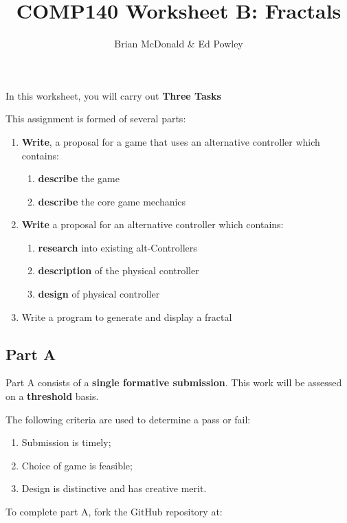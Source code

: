 \documentclass{../../../fal_assignment}
\title{COMP140 Worksheet B: Fractals}
\author{Brian McDonald \& Ed Powley}
\begin{document}
\maketitle

In this worksheet, you will carry out \textbf{Three Tasks}

This assignment is formed of several parts:

\begin{enumerate}[label=(\Alph*)]
	\item \textbf{Write}, a proposal for a game that uses an alternative controller which contains:
	\begin{enumerate}[label=\roman*.]
		\item \textbf{describe} the game
		\item \textbf{describe} the core game mechanics
	\end{enumerate}
	\item \textbf{Write} a proposal for an alternative controller which contains: 
	\begin{enumerate}[label=\roman*.]
		\item \textbf{research} into existing alt-Controllers
		\item \textbf{description} of the physical controller
		\item \textbf{design} of physical controller
	\end{enumerate}
	\item {Write} a program to generate and display a fractal
\end{enumerate}


\subsection*{Part A}

Part A consists of a \textbf{single formative submission}. This work will be assessed on a \textbf{threshold} basis. 

The following criteria are used to determine a pass or fail:

\begin{enumerate}[label=(\alph*)]
	\item Submission is timely;
	\item Choice of game is feasible;
	\item Design is distinctive and has creative merit.
\end{enumerate}

To complete part A, fork the GitHub repository at:
\end{document}
